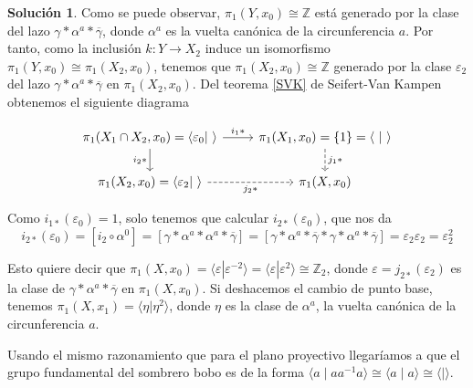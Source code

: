 \documentclass{article}
\theoremstyle{plain}
\theoremstyle{definition}
\newtheorem*{sol*}{Solución}
\providecommand{\func}[2]{\colon{#1}\longrightarrow{#2}}
\newcommand{\Z}{\mathbb{Z}}
\begin{document}
\begin{sol*}
Como se puede observar, $\pi_1(Y,x_0)\cong\Z$ está generado por la clase del lazo $\gamma*\alpha^a*\overline{\gamma}$, donde $\alpha^a$ es la vuelta canónica de la circunferencia $a$. Por tanto, como la inclusión $k\func{Y}{X_2}$ induce un isomorfismo $\pi_1(Y,x_0)\cong\pi_1(X_2,x_0)$, tenemos que $\pi_1(X_2,x_0)\cong\Z$ generado por la clase $\varepsilon_2$ del lazo $\gamma*\alpha^a*\overline{\gamma}$ en $\pi_1(X_2,x_0)$. Del teorema \ref{SVK} de Seifert-Van Kampen obtenemos el siguiente diagrama

\[
\begin{tikzcd}
\pi_1(X_1\cap X_2,x_0)=\langle \varepsilon_0|\ \rangle \ar[r, "i_1*"]\arrow[d,"i_2*"'] & \pi_1(X_1,x_0)=\{1\}=\langle\ |\ \rangle\arrow[d,dashed,"j_1*"]\\
\pi_1(X_2,x_0)=\langle \varepsilon_2|\ \rangle\arrow[r,dashrightarrow,"j_2*"'] & \pi_1(X,x_0)
\end{tikzcd}
\]

Como $i_{1*}(\varepsilon_0)=1$, solo tenemos que calcular $i_{2*}(\varepsilon_0)$, que nos da
\[
i_{2*}(\varepsilon_0)=[i_2\circ\alpha^0]=[\gamma*\alpha^a*\alpha^a*\overline{\gamma}]=[\gamma*\alpha^a*\overline{\gamma}*\gamma*\alpha^a*\overline{\gamma}]=\varepsilon_2\varepsilon_2=\varepsilon_2^2
\]

Esto quiere decir que $\pi_1(X,x_0)=\langle\varepsilon|\varepsilon^{-2}\rangle =\langle\varepsilon|\varepsilon^{2}\rangle\cong\Z_2$, donde $\varepsilon=j_{2*}(\varepsilon_2)$ es la clase de $\gamma*\alpha^a*\overline{\gamma}$ en $\pi_1(X,x_0)$. Si deshacemos el cambio de punto base, 
tenemos  $\pi_1(X,x_1)=\langle\eta|\eta^{2}\rangle$, donde $\eta$ es la clase de $\alpha^a$, la vuelta canónica de la circunferencia $a$.

Usando el mismo razonamiento que para el plano proyectivo llegaríamos a que el grupo fundamental del sombrero bobo es de la forma $\langle a\mid aa^{-1}a\rangle\cong\langle a\mid a\rangle\cong\langle\mid\rangle$.
\end{sol*}

\newpage
\end{document}
